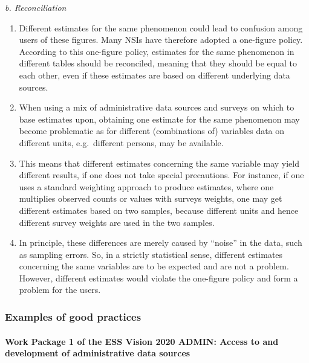 \documentclass[
]{article}
\begin{document}
\emph{b. Reconciliation}

\begin{enumerate}
\def\labelenumi{\arabic{enumi}.}
\setcounter{enumi}{239}
\item
  Different estimates for the same phenomenon could lead to confusion
  among users of these figures. Many NSIs have therefore adopted a
  one-figure policy. According to this one-figure policy, estimates
  for the same phenomenon in different tables should be reconciled,
  meaning that they should be equal to each other, even if these
  estimates are based on different underlying data sources.
\item
  When using a mix of administrative data sources and surveys on
  which to base estimates upon, obtaining one estimate for the same
  phenomenon may become problematic as for different (combinations of)
  variables data on different units, e.g.~different persons, may be
  available.
\item
  This means that different estimates concerning the same variable
  may yield different results, if one does not take special
  precautions. For instance, if one uses a standard weighting approach
  to produce estimates, where one multiplies observed counts or values
  with surveys weights, one may get different estimates based on two
  samples, because different units and hence different survey weights
  are used in the two samples.
\item
  In principle, these differences are merely caused by ``noise'' in the
  data, such as sampling errors. So, in a strictly statistical sense,
  different estimates concerning the same variables are to be expected
  and are not a problem. However, different estimates would violate
  the one-figure policy and form a problem for the users.
\end{enumerate}

\hypertarget{d.5.-examples-of-good-practices}{%
\subsubsection{Examples of good practices}\label{d.5.-examples-of-good-practices}}

\hypertarget{work-package-1-of-the-ess-vision-2020-admin-access-to-and-development-of-administrative-data-sources-1}{%
\paragraph{Work Package 1 of the ESS Vision 2020 ADMIN: Access to and development of administrative data sources}\label{work-package-1-of-the-ess-vision-2020-admin-access-to-and-development-of-administrative-data-sources-1}}
\end{document}
